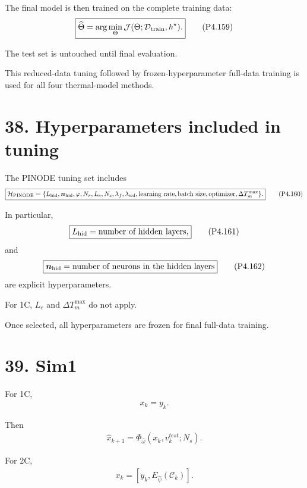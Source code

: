\documentclass[11pt]{article}
\begin{document}
The final model is then trained on the complete training data:
\begin{align}
\boxed{
\widehat\Theta
=
\arg\min_\Theta
\mathcal J
(
\Theta;
\mathcal D_{\rm train},
h^\star
).
}
\tag{P4.159}
\end{align}

The test set is untouched until final evaluation.

This reduced-data tuning followed by frozen-hyperparameter full-data training is used for all four thermal-model methods.

\section*{38. Hyperparameters included in tuning}

The PINODE tuning set includes
\begin{align}
\boxed{
\mathcal H_{\rm PINODE}
=
\{
L_{\rm hid},
\bm n_{\rm hid},
\varphi,
N_r,
L_e,
N_s,
\lambda_f,
\lambda_{\rm wd},
\text{learning rate},
\text{batch size},
\text{optimizer},
\Delta T_m^{\max}
\}.
}
\tag{P4.160}
\end{align}

In particular,
\begin{align}
\boxed{
L_{\rm hid}
=
\text{number of hidden layers},
}
\tag{P4.161}
\end{align}
and
\begin{align}
\boxed{
\bm n_{\rm hid}
=
\text{number of neurons in the hidden layers}
}
\tag{P4.162}
\end{align}
are explicit hyperparameters.

For 1C, \(L_e\) and \(\Delta T_m^{\max}\) do not apply.

Once selected, all hyperparameters are frozen for final full-data training.

\section*{39. Sim1}

For 1C,
\begin{align}
\boxed{x_k=y_k.}
\tag{P4.163}
\end{align}

Then
\begin{align}
\boxed{
\widehat x_{k+1}
=
\Phi_{\widehat\omega}
(x_k,v_k^{test};N_s).
}
\tag{P4.164}
\end{align}

For 2C,
\begin{align}
\boxed{
x_k=[y_k,E_{\widehat\psi}(\mathcal C_k)].
}
\tag{P4.165}
\end{align}
\end{document}
